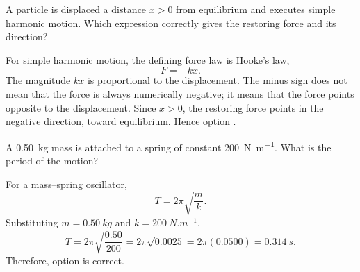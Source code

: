 %

\begin{quizquestion}[
  id=phy104-osc-001,
  topic=oscillations,
  difficulty=foundation,
  marks=1,
  correct=C,
  tags={shm,restoring-force,hookes-law},
  outcome={Identify the magnitude and direction of a restoring force}
]
  A particle is displaced a distance \(x>0\) from equilibrium and executes simple harmonic motion. Which expression correctly gives the restoring force and its direction?
\end{quizquestion}
\begin{quizsolution}
  For simple harmonic motion, the defining force law is Hooke's law,
    \[
      F=-kx.
    \]
    The magnitude \(kx\) is proportional to the displacement. The minus sign does not mean that the force is always numerically negative; it means that the force points opposite to the displacement. Since \(x>0\), the restoring force points in the negative direction, toward equilibrium. Hence option \textbf{\quizcorrectletter}.
\end{quizsolution}

\begin{quizquestion}[
  id=phy104-osc-002,
  topic=oscillations,
  difficulty=foundation,
  marks=1,
  correct=B,
  tags={mass-spring,period,angular-frequency},
  outcome={Calculate the period of a mass--spring oscillator}
]
  A \SI{0.50}{kg} mass is attached to a spring of constant \SI{200}{N.m^{-1}}. What is the period of the motion?
\end{quizquestion}
\begin{quizsolution}
  For a mass{--}spring oscillator,
    \[
      T=2\pi\sqrt{\frac{m}{k}}.
    \]
    Substituting \(m=\SI{0.50}{kg}\) and \(k=\SI{200}{N.m^{-1}}\),
    \[
      T=2\pi\sqrt{\frac{0.50}{200}}
      =2\pi\sqrt{0.0025}
      =2\pi(0.0500)
      =\SI{0.314}{s}.
    \]
    Therefore, option \textbf{\quizcorrectletter} is correct.
\end{quizsolution}

